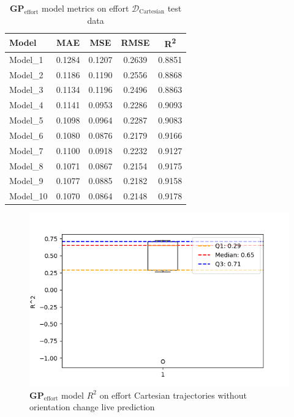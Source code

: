     
    \begin{table}[H]
    \centering
    \begin{tabular}{lcccc}
    \toprule
    \textbf{Model} & \textbf{MAE} & \textbf{MSE} & \textbf{RMSE} & \textbf{R\textsuperscript{2}} \\
    \midrule
    Model\_1 & 0.1284 & 0.1207 & 0.2639 & 0.8851 \\
    Model\_2 & 0.1186 & 0.1190 & 0.2556 & 0.8868 \\
    Model\_3 & 0.1134 & 0.1196 & 0.2496 & 0.8863 \\
    Model\_4 & 0.1141 & 0.0953 & 0.2286 & 0.9093 \\
    Model\_5 & 0.1098 & 0.0964 & 0.2287 & 0.9083 \\
    Model\_6 & 0.1080 & 0.0876 & 0.2179 & 0.9166 \\
    Model\_7 & 0.1100 & 0.0918 & 0.2232 & 0.9127 \\
    Model\_8 & 0.1071 & 0.0867 & 0.2154 & 0.9175 \\
    Model\_9 & 0.1077 & 0.0885 & 0.2182 & 0.9158 \\
    Model\_10 & 0.1070 & 0.0864 & 0.2148 & 0.9178 \\
    \bottomrule
    \end{tabular}
    \caption{\(\boldsymbol{GP}_{\text{effort}}\) model metrics on effort \(\mathcal{D}_{\text{Cartesian}}\) test data}
    \end{table}

    \begin{figure}[H]
    \centering
    \includegraphics[width=1\columnwidth]{Images/05_results/effort_boxplot_live_non_OC_R^2.png}
    \caption[\(\boldsymbol{GP}_{\text{effort}}\) model \(R^2\) on effort Cartesian trajectories without orientation change live prediction]{\(\boldsymbol{GP}_{\text{effort}}\) model \(R^2\) on effort Cartesian trajectories without orientation change live prediction}
    \label{fig:effort_no_oc_R^2_live}
    \end{figure}

